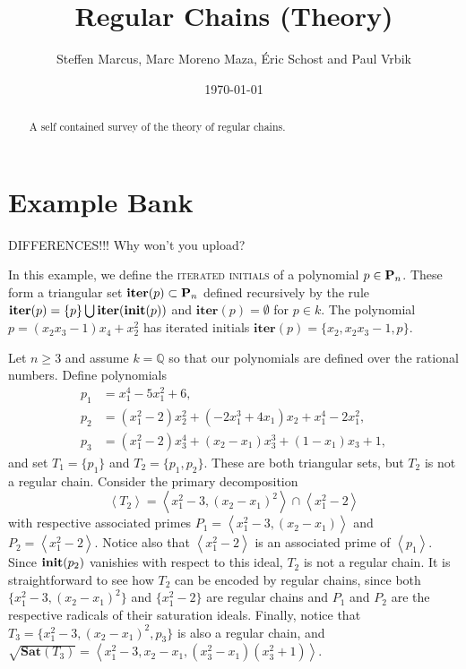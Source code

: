 \documentclass[12pt]{article}
\title{Regular Chains (Theory)}
\author{Steffen Marcus, Marc Moreno Maza, \'Eric Schost and Paul Vrbik}
\date{\today}
\newcommand{\Emph}[1]{\textsc{#1}}
\begin{document}
\maketitle


\begin{abstract}
A self contained survey of the theory of regular chains.
\end{abstract}

\section*{Example Bank}

DIFFERENCES!!! Why won't you upload?

\begin{example}  
In this example, we define the \Emph{iterated initials} of a polynomial $p\in\mathbf{P}_n$.  These form a triangular set $\textbf{iter}(p)\subset \mathbf{P}_n$ defined recursively by the rule $\textbf{iter}(p)=\{p\}\bigcup\textbf{iter}(\textbf{init}(p))$ and $\textbf{iter}(p) = \emptyset$ for $p\in k$.  The polynomial $p=(x_2x_3-1)x_4+x_2^2$ has iterated initials $\textbf{iter}(p)=\{x_2,x_2x_3-1,p\}$.
\end{example}

\begin{example}   
Let $n\geq 3$ and assume $k=\mathbb{Q}$ so that our polynomials are defined over the rational numbers.  Define polynomials
\begin{align*}
p_1 &= x_1^4-5x_1^2+6,\\
p_2 &=(x_1^2-2)x_2^2+(-2x_1^3+4x_1)x_2+x_1^4-2x_1^2,\\
p_3 &=(x_1^2-2)x_3^4+(x_2-x_1)x_3^3+(1-x_1)x_3+1,
\end{align*}
and set $T_1=\{p_1\}$ and $T_2=\{p_1,p_2\}$.  These are both triangular sets, but $T_2$ is not a regular chain.  Consider the primary decomposition
\[
\left<T_2\right>=\left<x_1^2-3,(x_2-x_1)^2\right>\cap\left<x_1^2-2\right>
\]
with respective associated primes $P_1=\left<x_1^2-3,(x_2-x_1)\right>$ and $P_2=\left<x_1^2-2\right>.$  Notice also that $\left<x_1^2-2\right>$ is an associated prime of $\left<p_1\right>$.  Since $\textbf{init}(p_2)$ vanishies with respect to this ideal, $T_2$ is not a regular chain.  It is straightforward to see how $T_2$ can be encoded by regular chains, since both $\{x_1^2-3,(x_2-x_1)^2\}$ and $\{x_1^2-2\}$ are regular chains and $P_1$ and $P_2$ are the respective radicals of their saturation ideals.  Finally, notice that $T_3=\{x_1^2-3,(x_2-x_1)^2, p_3\}$ is also a regular chain, and $\sqrt{\textbf{Sat}(T_3)}=\left<x_1^2-3,x_2-x_1, (x_3^2-x_1)(x_3^2+1)\right>$.
\end{example}
\end{document}
